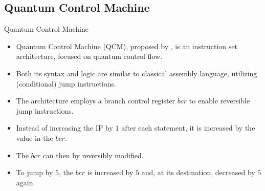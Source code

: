 \subsection{Quantum Control Machine}
\begin{frame}{Quantum Control Machine}
    \begin{itemize}
        \item Quantum Control Machine (QCM), proposed by \cite{YVC24}, is an instruction set architecture, focused on quantum control flow.
        \item Both its syntax and logic are similar to classical assembly language, utilizing (conditional) jump instructions.
        \item The architecture employs a branch control register $bcr$ to enable reversible jump instructions.
        \item Instead of increasing the IP by $1$ after each statement, it is increased by the value in the $bcr$.
        \item The $bcr$ can then by reversibly modified.
        \item To jump by $5$, the $bcr$ is increased by $5$ and, at its destination, decreased by $5$ again.  
    \end{itemize}
\end{frame}



